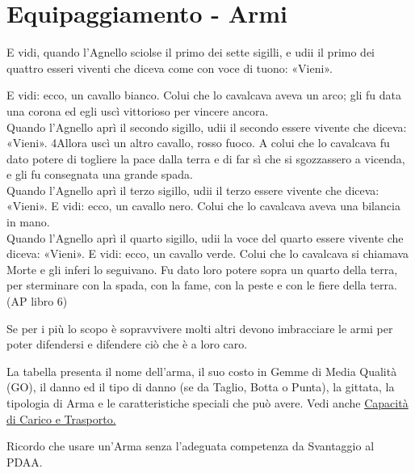 \documentclass[12pt,a4paper,twoside,openany]{book}
\begin{document}
\section{Equipaggiamento - Armi}\label{equipaggiamentoarmi}
\hypertarget{equipaggiamento.armi}{}

\label{equipaggiamento---armi}
\begin{changemargin}{0.3cm}{0.3cm}\begin{enfasi}{
E vidi, quando l’Agnello sciolse il primo dei sette sigilli, e udii il primo dei quattro esseri viventi che diceva come con voce di tuono: «Vieni». 

E vidi: ecco, un cavallo bianco. Colui che lo cavalcava aveva un arco; gli fu data una corona ed egli uscì vittorioso per vincere ancora.\\

Quando l’Agnello aprì il secondo sigillo, udii il secondo essere vivente che diceva: «Vieni». 4Allora uscì un altro cavallo, rosso fuoco. A colui che lo cavalcava fu dato potere di togliere la pace dalla terra e di far sì che si sgozzassero a vicenda, e gli fu consegnata una grande spada.\\

Quando l’Agnello aprì il terzo sigillo, udii il terzo essere vivente che diceva: «Vieni». E vidi: ecco, un cavallo nero. Colui che lo cavalcava aveva una bilancia in mano.\\

Quando l’Agnello aprì il quarto sigillo, udii la voce del quarto essere vivente che diceva: «Vieni». E vidi: ecco, un cavallo verde. Colui che lo cavalcava si chiamava Morte e gli inferi lo seguivano. Fu dato loro potere sopra un quarto della terra, per sterminare con la spada, con la fame, con la peste e con le fiere della terra. (AP libro 6)
}\end{enfasi}\end{changemargin}

\begin{multicols}{2}
	

Se per i più lo scopo è sopravvivere molti altri devono imbracciare le armi per poter difendersi e difendere ciò che è a loro caro.

La tabella presenta il nome dell'arma, il suo costo in Gemme di Media Qualità (GO), il danno ed il tipo di danno (se da Taglio, Botta o Punta), la gittata, la tipologia di Arma e le caratteristiche speciali che può avere. Vedi anche \hyperref[sec:capacita-di-carico-e-trasporto-ingombro]{Capacità di Carico e Trasporto.}

Ricordo che usare un'Arma senza l'adeguata competenza da Svantaggio al PDAA.

\end{multicols}
\end{document}
